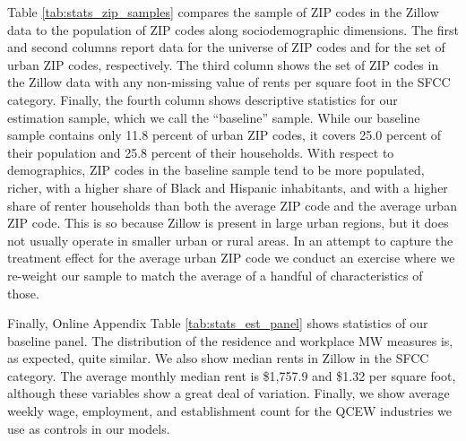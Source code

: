 Table \ref{tab:stats_zip_samples} compares the sample of ZIP codes in the Zillow
data to the population of ZIP codes along sociodemographic dimensions.
The first and second columns report data for the universe of ZIP codes and 
for the set of urban ZIP codes, respectively.
The third column shows the set of ZIP codes in the Zillow data with any 
non-missing value of rents per square foot in the SFCC category.
Finally, the fourth column shows descriptive statistics for our estimation 
sample, which we call the ``baseline'' sample.
While our baseline sample contains only 11.8 percent of urban ZIP codes, it 
covers 25.0 percent of their population and 25.8 percent of their households.
With respect to demographics, ZIP codes in the baseline sample tend to be 
more populated, richer, with a higher share of Black and Hispanic inhabitants, 
and with a higher share of renter households than both the average ZIP code 
and the average urban ZIP code.
This is so because Zillow is present in large urban regions, but 
it does not usually operate in smaller urban or rural areas.
In an attempt to capture the treatment effect for the average urban ZIP code 
we conduct an exercise where we re-weight our sample to match the average 
of a handful of characteristics of those.

Finally, Online Appendix Table \ref{tab:stats_est_panel} shows statistics 
of our baseline panel.
The distribution of the residence and workplace MW measures is, as expected,
quite similar.
We also show median rents in Zillow in the SFCC category.
The average monthly median rent is \$1,757.9 and \$1.32 per square foot, 
although these variables show a great deal of variation.
Finally, we show average weekly wage, employment, and establishment count 
for the QCEW industries we use as controls in our models.
